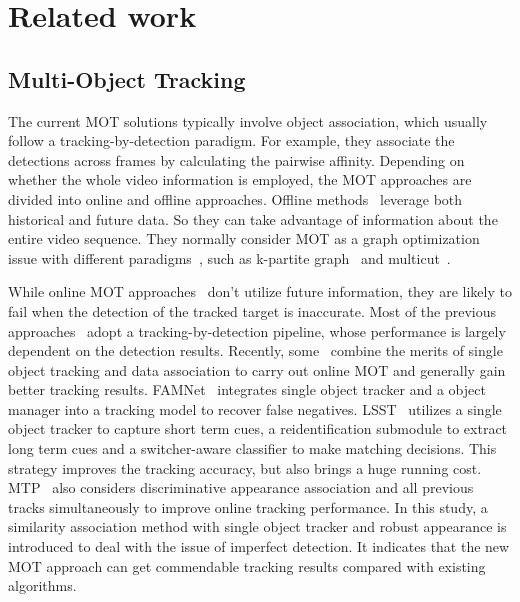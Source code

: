 \documentclass[times,twocolumn,final,authoryear]{elsarticle}
\begin{document}
\section{Related work}

\subsection{Multi-Object Tracking}
The current MOT solutions typically involve object association, which usually follow {a} tracking-by-detection paradigm. 
For example, {they} associate the detections across frames by calculating the pairwise affinity. 
Depending on whether the whole video information is employed, the MOT approaches are {divided} into online and offline approaches.
Offline methods~\citep{tang2017multiple} leverage both historical and future data. So they can take advantage of information about the entire video sequence.
They normally consider MOT as a graph optimization issue with different paradigms~\citep{li2020graph}, such as k-partite graph~\citep{dehghan2015gmmcp} and multicut~\citep{tang2017multiple}.

{
While online MOT approaches~\citep{chu2017online, RN1004, junbo2020a} don't utilize future information{, they} are likely to fail when the detection of the tracked target is inaccurate. 
Most of the previous approaches~\citep{bae2014robust,xu2019spatial-temporal} adopt a tracking-by-detection pipeline, whose performance is largely dependent on the detection results.
Recently, some~\citep{feng2019multi,RN455,RN542} combine the merits of single object tracking and data association to carry out online MOT and generally gain better tracking results.
FAMNet~\citep{RN542} integrates single object tracker and a object manager into a tracking model to recover false negatives. 
LSST~\citep{feng2019multi} utilizes a single object tracker to capture short term cues, a reidentification submodule to extract long term cues and a switcher-aware classifier to make matching decisions.
This strategy improves the tracking accuracy, but also brings a huge running cost.
MTP~\citep{kim2021discriminative} also considers discriminative appearance association and all previous tracks simultaneously to improve online tracking performance.}
In this study, a similarity association method with single object tracker and robust appearance is introduced to deal with the issue of imperfect detection.
It indicates that the new MOT approach can get commendable tracking results compared with existing algorithms.
\end{document}
